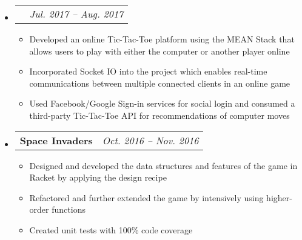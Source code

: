 \documentclass[letterpaper,11pt]{article}
\makeatletter
\newcommand{\resitem}[1]{\item #1 \vspace{-2pt}}
\newcommand{\ressubheadingproj}[4]{
\begin{tabular*}{6.5in}{l@{\extracolsep{\fill}}r}
    \textbf{#1} & \textit{#2} \\
\end{tabular*}\vspace{-6pt}}
\makeatother
\begin{document}
{\begin{itemize}
{\begin{itemize}
        \end{itemize}
        }
    \end{itemize}

    \begin{itemize}
        \item\ressubheadingproj
        {\href
        {https://github.com/jeremylinlin/tic-tac-toe-mean}
        {Multiplayer Tic-Tac-Toe Platform}
        }
        {Jul. 2017 -- Aug. 2017}
        {}{}  %
        {\footnotesize
        \begin{itemize}
            \resitem
            {Developed an online Tic-Tac-Toe platform using the MEAN Stack that allows
            users to play with either the computer or another player online}
            \resitem{Incorporated Socket IO into the project which enables real-time
            communications between multiple connected clients in an online game}
            \resitem{Used Facebook/Google Sign-in services for social login and consumed a
            third-party Tic-Tac-Toe API for recommendations of computer moves}
        \end{itemize}
        }
    \end{itemize}

    \begin{itemize}
        \item\ressubheadingproj
        {Space Invaders}
        {Oct. 2016 -- Nov. 2016}
        {}{}
        {\footnotesize
        \begin{itemize}
            \resitem{Designed and developed the data structures and features of the game in
            Racket by applying the design recipe}
            \resitem{Refactored and further extended the game by intensively using higher-order
            functions}
            \resitem{Created unit tests with 100\% code coverage}

        \end{itemize}
        }
    \end{itemize}

}
\end{document}
